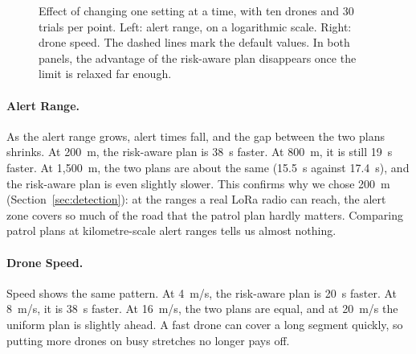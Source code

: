 \documentclass[11pt]{article}
\begin{document}
\begin{figure}[htbp]
\begin{minipage}[t]{0.48\textwidth}
\end{minipage}
\caption{Effect of changing one setting at a time, with ten drones and 30
trials per point. Left: alert range, on a logarithmic scale. Right: drone
speed. The dashed lines mark the default values. In both panels, the advantage
of the risk-aware plan disappears once the limit is relaxed far enough.}
\label{fig:sens}
\end{figure}

\paragraph{Alert Range.}
As the alert range grows, alert times fall, and the gap between the two plans
shrinks. At 200~m, the risk-aware plan is 38~s faster. At 800~m, it is still
19~s faster. At 1{,}500~m, the two plans are about the same (15.5~s against
17.4~s), and the risk-aware plan is even slightly slower. This confirms why we
chose 200~m (Section~\ref{sec:detection}): at the ranges a real LoRa radio can
reach, the alert zone covers so much of the road that the patrol plan hardly
matters. Comparing patrol plans at kilometre-scale alert ranges tells us almost
nothing.

\paragraph{Drone Speed.}
Speed shows the same pattern. At 4~m/s, the risk-aware plan is 20~s faster. At
8~m/s, it is 38~s faster. At 16~m/s, the two plans are equal, and at 20~m/s the
uniform plan is slightly ahead. A fast drone can cover a long segment quickly,
so putting more drones on busy stretches no longer pays off.
\end{document}
